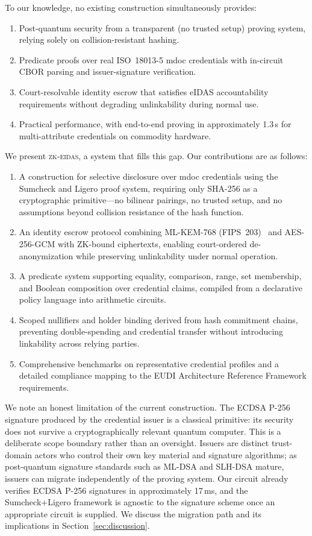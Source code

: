 To our knowledge, no existing construction simultaneously provides:
\begin{enumerate}
  \item Post-quantum security from a transparent (no trusted setup) proving
        system, relying solely on collision-resistant hashing.
  \item Predicate proofs over real ISO~18013-5 mdoc credentials with in-circuit
        CBOR parsing and issuer-signature verification.
  \item Court-resolvable identity escrow that satisfies eIDAS accountability
        requirements without degrading unlinkability during normal use.
  \item Practical performance, with end-to-end proving in approximately 1.3\,s
        for multi-attribute credentials on commodity hardware.
\end{enumerate}

We present \textsc{zk-eidas}, a system that fills this gap. Our contributions
are as follows:
\begin{enumerate}
  \item A construction for selective disclosure over mdoc credentials using the
        Sumcheck and Ligero proof system, requiring only SHA-256 as a
        cryptographic primitive---no bilinear pairings, no trusted setup, and no
        assumptions beyond collision resistance of the hash function.
  \item An identity escrow protocol combining ML-KEM-768 (FIPS~203)~\cite{fips203}
        and AES-256-GCM with ZK-bound ciphertexts, enabling court-ordered
        de-anonymization while preserving unlinkability under normal operation.
  \item A predicate system supporting equality, comparison, range, set
        membership, and Boolean composition over credential claims, compiled
        from a declarative policy language into arithmetic circuits.
  \item Scoped nullifiers and holder binding derived from hash commitment
        chains, preventing double-spending and credential transfer without
        introducing linkability across relying parties.
  \item Comprehensive benchmarks on representative credential profiles and a
        detailed compliance mapping to the EUDI Architecture Reference Framework
        requirements.
\end{enumerate}

We note an honest limitation of the current construction. The ECDSA P-256
signature produced by the credential issuer is a classical primitive: its
security does not survive a cryptographically relevant quantum computer. This is
a deliberate scope boundary rather than an oversight. Issuers are distinct
trust-domain actors who control their own key material and signature algorithms;
as post-quantum signature standards such as ML-DSA and SLH-DSA mature, issuers
can migrate independently of the proving system. Our circuit already verifies
ECDSA P-256 signatures in approximately 17\,ms, and the Sumcheck+Ligero
framework is agnostic to the signature scheme once an appropriate circuit is
supplied. We discuss the migration path and its implications in
Section~\ref{sec:discussion}.

